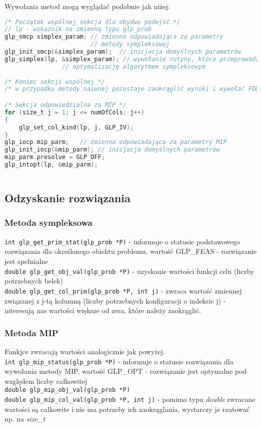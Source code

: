 Wywołania metod mogą wyglądać podobnie jak niżej:
\begin{lstlisting}[language=C]
/* Początek wspólnej sekcja dla obydwu podejść */
// lp - wskaźnik na zmienną typu glp_prob
glp_smcp simplex_param; // zmienna odpowiadająca za parametry 
                        // metody sympleksowej
glp_init_smcp(&simplex_param);  // inicjacja domyślnych parametrów
glp_simplex(lp, &simplex_param); // wywołanie rutyny, która przeprowadza 
				// optymalizację algorytmem sympleksowym
	
/* Koniec sekcji wspólnej */
/* w przypadku metody naiwnej pozostaje zaokrąglić wyniki i wywołać FDD */

/* Sekcja odpowiedzialna za MIP */
for (size_t j = 1; j <= numOfCols; j++)
{
	glp_set_col_kind(lp, j, GLP_IV);
}
glp_iocp mip_parm;   // zmienna odpowiadająca za parametry MIP
glp_init_iocp(&mip_parm); // inicjacja domyślnych parametrów
mip_parm.presolve = GLP_OFF;
glp_intopt(lp, &mip_parm);
	
\end{lstlisting}


\subsection{Odzyskanie rozwiązania}
\subsubsection{Metoda sympleksowa}
{\parindent0pt
\verb|int glp_get_prim_stat(glp_prob *P)| - informuje o statusie podstawowego rozwiązania dla określonego obiektu problemu, wartość GLP\_FEAS - rozwiązanie jest spełnialne \\
}
\verb|double glp_get_obj_val(glp_prob *P)| - uzyskanie wartości funkcji celu (liczby potrzebnych belek)  \\
\verb|double glp_get_col_prim(glp_prob *P, int j)| - zwraca wartość zmiennej związanej z j-tą kolumną (liczby potrzebnych konfiguracji o indeksie j) - interesują nas wartości większe od zera, które należy zaokrąglić.

\subsubsection{Metoda MIP}
Funkjce zwracają wartości analogicznie jak powyżej. \\
\verb|int glp_mip_status(glp_prob *P)| - informuje o statusie rozwiązania dla wywołania metody MIP, wartość GLP\_OPT - rozwiązanie jest optymalne pod względem liczby całkowitej \\
\verb|double glp_mip_obj_val(glp_prob *P)|\\
\verb|double glp_mip_col_val(glp_prob *P, int j)| - pomimo typu \textit{double} zwracane wartości są całkowite i nie ma potrzeby ich zaokrąglania, wystarczy je rzutować np. na \textit{size\_t}

